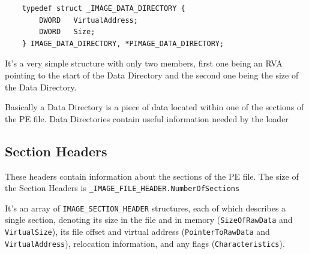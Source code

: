 \begin{verbatim}
    typedef struct _IMAGE_DATA_DIRECTORY {
        DWORD   VirtualAddress;
        DWORD   Size;
    } IMAGE_DATA_DIRECTORY, *PIMAGE_DATA_DIRECTORY;    
\end{verbatim}

It’s a very simple structure with only two members, first one being an RVA pointing to the start of the Data Directory and the second one being the size of the Data Directory.


Basically a Data Directory is a piece of data located within one of the sections of the PE file. Data Directories contain useful information needed by the loader

\subsection{Section Headers}


These headers contain information about the sections of the PE file. The size of the Section Headers is \verb+_IMAGE_FILE_HEADER.NumberOfSections+

It’s an array of \verb+IMAGE_SECTION_HEADER+ structures, each of which describes a single section, denoting its size in the file and in memory (\verb+SizeOfRawData+ and \verb+VirtualSize+), its file offset and virtual address (\verb+PointerToRawData+ and \verb+VirtualAddress+), relocation information, and any flags (\verb+Characteristics+).

